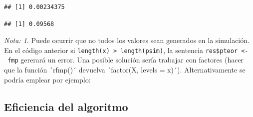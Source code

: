 \documentclass[
]{book}
\newenvironment{Shaded}{\begin{snugshade}}{\end{snugshade}}
\newcommand{\AttributeTok}[1]{\textcolor[rgb]{0.77,0.63,0.00}{#1}}
\newcommand{\DecValTok}[1]{\textcolor[rgb]{0.00,0.00,0.81}{#1}}
\newcommand{\FunctionTok}[1]{\textcolor[rgb]{0.00,0.00,0.00}{#1}}
\newcommand{\NormalTok}[1]{#1}
\newcommand{\OtherTok}[1]{\textcolor[rgb]{0.56,0.35,0.01}{#1}}
\newcommand{\SpecialCharTok}[1]{\textcolor[rgb]{0.00,0.00,0.00}{#1}}
\theoremstyle{break}
\theoremstyle{definition}
\theoremstyle{definition}
\theoremstyle{definition}
\theoremstyle{definition}
\theoremstyle{remark}
\newtheorem*{remark}{Nota: }
\begin{document}
\begin{verbatim}
## [1] 0.00234375
\end{verbatim}

\begin{Shaded}
\end{Shaded}

\begin{verbatim}
## [1] 0.09568
\end{verbatim}

\begin{remark}
{}Puede ocurrir que no todos los valores sean generados en la simulación.
En el código anterior si \texttt{length(x)\ \textgreater{}\ length(psim)}, la sentencia
\texttt{res\$pteor\ \textless{}-\ fmp} gererará un error.
Una posible solución sería trabajar con factores (hacer que la función ´rfmp()´ devuelva ´factor(X, levels = x)´). Alternativamente se podría emplear por ejemplo:
\end{remark}

\begin{Shaded}
\end{Shaded}

\hypertarget{eficiencia-del-algoritmo-1}{%
\subsection{Eficiencia del algoritmo}\label{eficiencia-del-algoritmo-1}}
\end{document}

